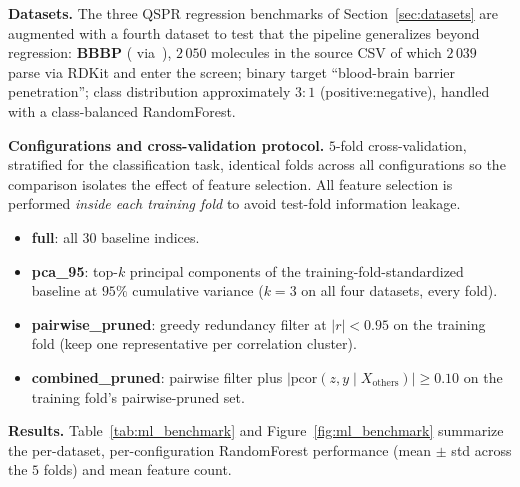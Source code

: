 \documentclass[STIX1COL]{WileyNJDv5}
\theoremstyle{definition}
\begin{document}
\textbf{Datasets.} The three QSPR regression benchmarks of
Section~\ref{sec:datasets} are augmented with a fourth dataset to
test that the pipeline generalizes beyond regression:
\textbf{BBBP} (\cite{Martins2012BBBP} via~\cite{MoleculeNet}), $2\,050$
molecules in the source CSV of which $2\,039$ parse via RDKit and
enter the screen; binary target ``blood-brain barrier
penetration''; class distribution approximately $3{:}1$
(positive:negative), handled with a class-balanced RandomForest.

\textbf{Configurations and cross-validation protocol.} $5$-fold
cross-validation, stratified for the classification task, identical
folds across all configurations so the comparison isolates the
effect of feature selection. All feature selection is performed
\emph{inside each training fold} to avoid test-fold information
leakage.
\begin{itemize}
\item \textbf{full}: all $30$ baseline indices.
\item \textbf{pca\_95}: top-$k$ principal components of the
training-fold-standardized baseline at $95\%$ cumulative variance
($k=3$ on all four datasets, every fold).
\item \textbf{pairwise\_pruned}: greedy redundancy filter at
$|r| < 0.95$ on the training fold (keep one representative per
correlation cluster).
\item \textbf{combined\_pruned}: pairwise filter plus
$|\mathrm{pcor}(z, y \mid X_{\mathrm{others}})| \ge 0.10$ on the
training fold's pairwise-pruned set.
\end{itemize}

\textbf{Results.} Table~\ref{tab:ml_benchmark} and
Figure~\ref{fig:ml_benchmark} summarize the per-dataset, per-configuration
RandomForest performance (mean $\pm$ std across the $5$ folds) and
mean feature count.
\end{document}
